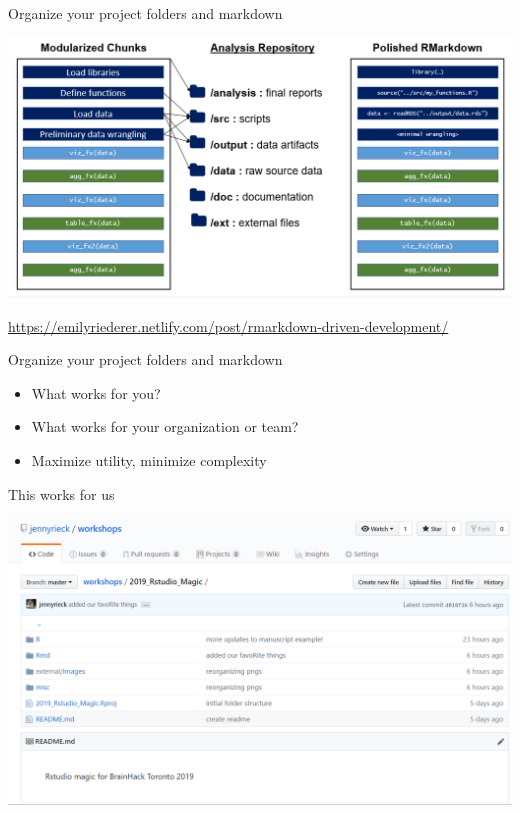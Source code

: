 \documentclass[ignorenonframetext,]{beamer}
\providecommand{\tightlist}{%
  \setlength{\itemsep}{0pt}\setlength{\parskip}{0pt}}
\begin{document}
\begin{frame}{Organize your project folders and markdown}
\protect\hypertarget{organize-your-project-folders-and-markdown}{}

\includegraphics{../external/images/setup_4_markdown_project.PNG}

\url{https://emilyriederer.netlify.com/post/rmarkdown-driven-development/}

\end{frame}

\begin{frame}{Organize your project folders and markdown}
\protect\hypertarget{organize-your-project-folders-and-markdown-1}{}

\begin{itemize}
\tightlist
\item
  What works for you?
\item
  What works for your organization or team?
\item
  Maximize utility, minimize complexity
\end{itemize}

\end{frame}

\begin{frame}{This works for us}
\protect\hypertarget{this-works-for-us}{}

\includegraphics{../external/images/setup_5_git.PNG}

\end{frame}
\end{document}
